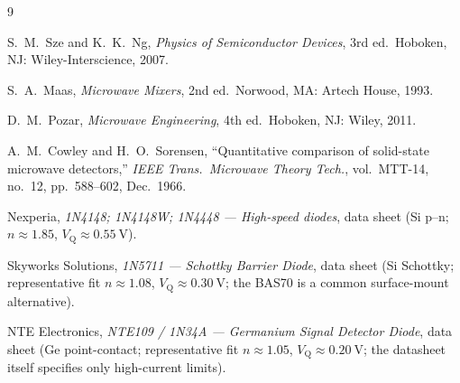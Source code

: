 \documentclass[12pt]{article}
\newcommand{\VQ}{V_{\mathrm{Q}}}
\begin{document}
\begin{thebibliography}{9}
\setlength{\itemsep}{2pt}
\setlength{\parsep}{0pt}

S.\ M.\ Sze and K.\ K.\ Ng, \textit{Physics of Semiconductor Devices}, 3rd ed.\ Hoboken, NJ: Wiley-Interscience, 2007.

S.\ A.\ Maas, \textit{Microwave Mixers}, 2nd ed.\ Norwood, MA: Artech House, 1993.

D.\ M.\ Pozar, \textit{Microwave Engineering}, 4th ed.\ Hoboken, NJ: Wiley, 2011.

A.\ M.\ Cowley and H.\ O.\ Sorensen, ``Quantitative comparison of solid-state microwave detectors,'' \textit{IEEE Trans.\ Microwave Theory Tech.}, vol.\ MTT-14, no.\ 12, pp.\ 588--602, Dec.\ 1966.

Nexperia, \textit{1N4148; 1N4148W; 1N4448 --- High-speed diodes}, data sheet (Si p--n; $n \approx 1.85$, $\VQ \approx \SI{0.55}{\volt}$).

Skyworks Solutions, \textit{1N5711 --- Schottky Barrier Diode}, data sheet (Si Schottky; representative fit $n \approx 1.08$, $\VQ \approx \SI{0.30}{\volt}$; the BAS70 is a common surface-mount alternative).

NTE Electronics, \textit{NTE109 / 1N34A --- Germanium Signal Detector Diode}, data sheet (Ge point-contact; representative fit $n \approx 1.05$, $\VQ \approx \SI{0.20}{\volt}$; the datasheet itself specifies only high-current limits).

\end{thebibliography}
\end{document}
